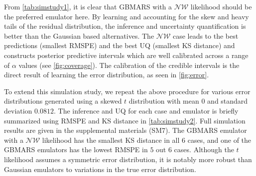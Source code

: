 \documentclass{article} %
\newcommand{\NW}{\mathcal{NW}}
\begin{document}
From \cref{tab:simstudy1}, it is clear that GBMARS with a $\NW$ likelihood should be the preferred emulator here. By learning and accounting for the skew and heavy tails of the residual distribution, the inference and uncertainty quantification is better than the Gaussian based alternatives. The $\NW$ case leads to the best predictions (smallest RMSPE) and the best UQ (smallest KS distance) and constructs posterior predictive intervals which are well calibrated across a range of $\alpha$ values (see \cref{fig:coverage}). The calibration of the credible intervals is the direct result of learning the error distribution, as seen in \cref{fig:error}. 

To extend this simulation study, we repeat the above procedure for various error distributions generated using a skewed $t$ distribution \citep{fernandez1998bayesian} with mean $0$ and standard deviation $0.0812$. The inference and UQ for each case and emulator is briefly summarized using RMSPE and KS distance in \cref{tab:simstudy2}. Full simulation results are given in the supplemental materials (SM7). The GBMARS emulator with a $\NW$ likelihood has the smallest KS distance in all $6$ cases, and one of the GBMARS emulators has the lowest RMSPE in $5$ out $6$ cases. Although the $t$ likelihood assumes a symmetric error distribution, it is notably more robust than Gaussian emulators to variations in the true error distribution. 
\end{document}
